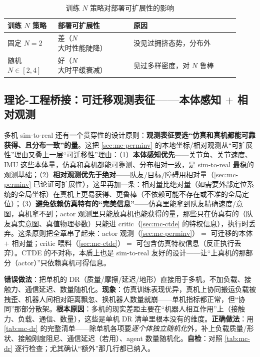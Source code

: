 \begin{table}[H]\centering\small
\caption{训练 $N$ 策略对部署可扩展性的影响}
\label{tab:mc-n-random}
\begin{tabular}{p{0.20\linewidth}p{0.30\linewidth}p{0.42\linewidth}}
\toprule
训练 $N$ 策略 & 部署可扩展性 & 原因 \\
\midrule
固定 $N{=}2$ & 差（$N$ 大时性能陡降） & 没见过拥挤态势，分布外 \\
随机 $N\in[2,4]$ & 好（$N$ 大时平缓衰减） & 见过多样密度，对 $N$ 鲁棒 \\
\bottomrule
\end{tabular}
\end{table}

\subsection{理论-工程桥接：可迁移观测表征——本体感知 $+$ 相对观测}
\label{sec:mc-transfer-obs}

多机 sim-to-real 还有一个贯穿性的设计原则：\textbf{观测表征要选“仿真和真机都能可靠获得、且分布一致”的量}。这把 \cref{sec:mc-perminv} 的本地坐标/相对观测从“可扩展性”理由又叠上一层“可迁移性”理由：（1）\textbf{本体感知优先}——关节角、关节速度、IMU 这些本体量，仿真和真机都能可靠测、分布相对一致，是 sim-to-real 最稳的观测基础；（2）\textbf{相对观测优先于绝对}——队友/目标/障碍用相对量（\cref{sec:mc-perminv} 已论证可扩展性），这里再加一条：相对量比绝对量（如需要外部定位系统的全局坐标）在真机上更易获得、更鲁棒（不依赖可能不存在或不准的全局定位）；（3）\textbf{避免依赖仿真特有的“完美信息”}——仿真里能拿到队友精确速度/意图，真机拿不到；actor 观测里只能放真机也能获得的量，那些只在仿真有的（队友真实意图、真值物理参数）只能进 critic（\cref{sec:mc-ctde} 的特权信息），执行时丢弃。这条原则把全章串了起来：actor 观测（\cref{sec:mc-perminv}）$=$ 可迁移的本体 $+$ 相对量；critic 喂料（\cref{sec:mc-ctde}）$=$ 可包含仿真特权信息（反正执行丢弃）。CTDE 的不对称，本质上也是 sim-to-real 友好的设计——让“上真机的那部分（actor）”只依赖真机可得信息。

\begin{pitfall}
\textbf{错误做法}：把单机的 DR（质量/摩擦/延迟/地形）直接用于多机，不加负载、接触力、通信延迟、数量随机化。\textbf{现象}：仿真训练表现优异，真机上协同搬运负载被拽歪、机器人间相对距离飘忽、换机器人数量就崩——单机指标都正常，但“协同”那部分散架。\textbf{根本原因}：多机的现实差距主要在“机器人相互作用”上（接触力、负载、通信、数量），这些是单机 DR 清单里根本没有的维度。\textbf{正确做法}：用 \cref{tab:mc-dr} 的完整清单——除单机各项要\emph{逐个体独立随机化}外，补上负载质量/形状、接触刚度阻尼、通信延迟（若用）、agent 数量随机化。\textbf{自检}：对照 \cref{tab:mc-dr} 逐行检查；尤其确认“额外”那几行都已纳入。
\end{pitfall}

